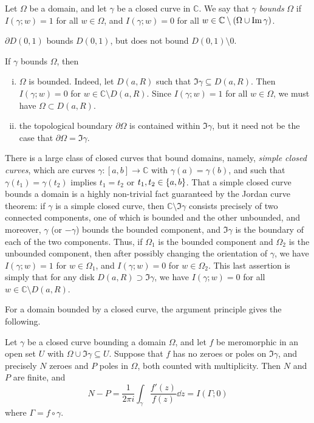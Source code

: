 \begin{definition}
	Let \( \Omega \) be a domain, and let \( \gamma \) be a closed curve in \( \mathbb C \).
	We say that \( \gamma \) \textit{bounds} \( \Omega \) if \( I(\gamma;w) = 1 \) for all \( w \in \Omega \), and \( I(\gamma;w) = 0 \) for all \( w \in \mathbb C \setminus \qty(\Omega \cup \Im \gamma) \).
\end{definition}
\begin{example}
	\( \partial D(0,1) \) bounds \( D(0,1) \), but does not bound \( D(0,1) \setminus \qty{0} \).
\end{example}
\begin{remark}
	If \( \gamma \) bounds \( \Omega \), then
	\begin{enumerate}[(i)]
		\item \( \Omega \) is bounded.
			Indeed, let \( D(a,R) \) such that \( \Im \gamma \subseteq D(a,R) \).
			Then \( I(\gamma;w) = 0 \) for \( w \in \mathbb C \setminus D(a,R) \).
			Since \( I(\gamma;w) = 1 \) for all \( w \in \Omega \), we must have \( \Omega \subset D(a,R) \).
		\item the topological boundary \( \partial \Omega \) is contained within \( \Im \gamma \), but it need not be the case that \( \partial \Omega = \Im \gamma \).
	\end{enumerate}
	There is a large class of closed curves that bound domains, namely, \textit{simple closed curves}, which are curves \( \gamma \colon [a,b] \to \mathbb C \) with \( \gamma(a) = \gamma(b) \), and such that \( \gamma(t_1) = \gamma(t_2) \) implies \( t_1 = t_2 \) or \( t_1, t_2 \in \qty{a,b} \).
	That a simple closed curve bounds a domain is a highly non-trivial fact guaranteed by the Jordan curve theorem: if \( \gamma \) is a simple closed curve, then \( \mathbb C \setminus \Im \gamma \) consists precisely of two connected components, one of which is bounded and the other unbounded, and moreover, \( \gamma \) (or \( -\gamma \)) bounds the bounded component, and \( \Im \gamma \) is the boundary of each of the two components.
	Thus, if \( \Omega_1 \) is the bounded component and \( \Omega_2 \) is the unbounded component, then after possibly changing the orientation of \( \gamma \), we have \( I(\gamma;w) = 1 \) for \( w \in \Omega_1 \), and \( I(\gamma;w) = 0 \) for \( w \in \Omega_2 \).
	This last assertion is simply that for any disk \( D(a,R) \supset \Im \gamma \), we have \( I(\gamma;w) = 0 \) for all \( w \in \mathbb C \setminus D(a,R) \).
\end{remark}
For a domain bounded by a closed curve, the argument principle gives the following.
\begin{corollary}
	Let \( \gamma \) be a closed curve bounding a domain \( \Omega \), and let \( f \) be meromorphic in an open set \( U \) with \( \Omega \cup \Im \gamma \subseteq U \).
	Suppose that \( f \) has no zeroes or poles on \( \Im \gamma \), and precisely \( N \) zeroes and \( P \) poles in \( \Omega \), both counted with multiplicity.
	Then \( N \) and \( P \) are finite, and
	\[ N - P = \frac{1}{2 \pi i} \int_\gamma \frac{f'(z)}{f(z)} \dd{z} = I(\Gamma;0) \]
	where \( \Gamma = f \circ \gamma \).
\end{corollary}
